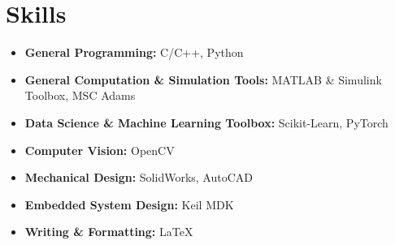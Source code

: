 \documentclass[letter,12pt]{article}
\begin{document}



\section{Skills}

    \begin{itemize}
        \setlength{\itemsep}{1pt}
        \setlength{\parskip}{0pt}
        \setlength{\parsep}{0pt}
        \item \textbf{General Programming:} C/C++, Python
        \item \textbf{General Computation \& Simulation Tools:} MATLAB \& Simulink Toolbox, MSC Adams
        \item \textbf{Data Science \& Machine Learning Toolbox:} Scikit-Learn, PyTorch
        \item \textbf{Computer Vision:} OpenCV
        \item \textbf{Mechanical Design:} SolidWorks, AutoCAD
        \item \textbf{Embedded System Design:} Keil MDK
        \item \textbf{Writing \& Formatting:} LaTeX
    \end{itemize}
    
\end{document}
